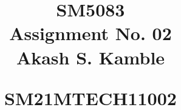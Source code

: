 \documentclass[journal,12pt,twocolumn]{IEEEtran}
\begin{document}
\newtheorem{theorem}{Theorem}[section]
\newtheorem{problem}{Problem}
\newtheorem{proposition}{Proposition}[section]
\newtheorem{lemma}{Lemma}[section]
\newtheorem{corollary}[theorem]{Corollary}
\newtheorem{example}{Example}[section]
\newtheorem{definition}[problem]{Definition}
\newcommand{\BEQA}{\begin{eqnarray}}
\newcommand{\EEQA}{\end{eqnarray}}
\newcommand{\define}{\stackrel{\triangle}{=}}

\providecommand{\mbf}{\mathbf}
\providecommand{\pr}[1]{\ensuremath{\Pr\left(#1\right)}}
\providecommand{\qfunc}[1]{\ensuremath{Q\left(#1\right)}}
\providecommand{\sbrak}[1]{\ensuremath{{}\left[#1\right]}}
\providecommand{\lsbrak}[1]{\ensuremath{{}\left[#1\right.}}
\providecommand{\rsbrak}[1]{\ensuremath{{}\left.#1\right]}}
\providecommand{\brak}[1]{\ensuremath{\left(#1\right)}}
\providecommand{\lbrak}[1]{\ensuremath{\left(#1\right.}}
\providecommand{\rbrak}[1]{\ensuremath{\left.#1\right)}}
\providecommand{\cbrak}[1]{\ensuremath{\left\{#1\right\}}}
\providecommand{\lcbrak}[1]{\ensuremath{\left\{#1\right.}}
\providecommand{\rcbrak}[1]{\ensuremath{\left.#1\right\}}}
\theoremstyle{remark}
\newtheorem{rem}{Remark}
\newcommand{\sgn}{\mathop{\mathrm{sgn}}}
\providecommand{\abs}[1]{\lvert#1\rvert}
\providecommand{\res}[1]{\Res\displaylimits_{#1}} 
\providecommand{\norm}[1]{\lVert#1\rVert}
\providecommand{\mtx}[1]{\mathbf{#1}}
\providecommand{\fourier}{\overset{\mathcal{F}}{ \rightleftharpoons}}
\providecommand{\system}{\overset{\mathcal{H}}{ \longleftrightarrow}}
\newcommand{\solution}{\noindent \textbf{Solution: }}
\newcommand{\cosec}{\,\text{cosec}\,}
\providecommand{\dec}[2]{\ensuremath{\overset{#1}{\underset{#2}{\gtrless}}}}
\newcommand{\myvec}[1]{\ensuremath{\begin{pmatrix}#1\end{pmatrix}}}
\newcommand{\cmyvec}[1]{\ensuremath{\begin{pmatrix*}[c]#1\end{pmatrix*}}}
\newcommand{\mydet}[1]{\ensuremath{\begin{vmatrix}#1\end{vmatrix}}}
\newcommand{\proj}[2]{\textbf{proj}_{\vec{#1}}\vec{#2}}
\newcommand{\RNum}[1]{\uppercase\expandafter{\romannumeral #1\relax}}
\let\StandardTheFigure\thefigure
\let\vec\mathbf

\title{
\LARGE SM5083\\
    \LARGE Assignment No. 02 \\[0.5em]
    
    \large Akash S. Kamble\par
    \large   SM21MTECH11002  \par
}
\maketitle
\renewcommand{\thefigure}{\theenumi}
\renewcommand{\thetable}{\theenumi}
\end{document}
